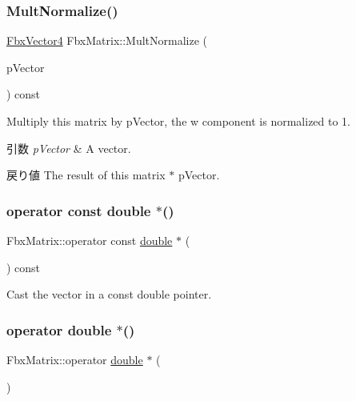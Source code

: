 \subsubsection{\texorpdfstring{Mult\+Normalize()}{MultNormalize()}}
{\footnotesize\ttfamily \hyperlink{class_fbx_vector4}{Fbx\+Vector4} Fbx\+Matrix\+::\+Mult\+Normalize (\begin{DoxyParamCaption}\item[{const \hyperlink{class_fbx_vector4}{Fbx\+Vector4} \&}]{p\+Vector }\end{DoxyParamCaption}) const}

Multiply this matrix by p\+Vector, the w component is normalized to 1. 
\begin{DoxyParams}{引数}
{\em p\+Vector} & A vector. \\
\hline
\end{DoxyParams}
\begin{DoxyReturn}{戻り値}
The result of this matrix $\ast$ p\+Vector. 
\end{DoxyReturn}
\mbox{\label{class_fbx_matrix_affabd5f07e4286c8da7faedee32c054f}} 
\subsubsection{\texorpdfstring{operator const double $\ast$()}{operator const double *()}}
{\footnotesize\ttfamily Fbx\+Matrix\+::operator const \hyperlink{class_fbx_matrix_a01f8be57393e5d9973b23897c29d5520}{double} $\ast$ (\begin{DoxyParamCaption}{ }\end{DoxyParamCaption}) const}



Cast the vector in a const double pointer. 

\mbox{\label{class_fbx_matrix_aef325dea7b08df3c2703e05403a431e8}} 
\subsubsection{\texorpdfstring{operator double $\ast$()}{operator double *()}}
{\footnotesize\ttfamily Fbx\+Matrix\+::operator \hyperlink{class_fbx_matrix_a01f8be57393e5d9973b23897c29d5520}{double} $\ast$ (\begin{DoxyParamCaption}{ }\end{DoxyParamCaption})}



